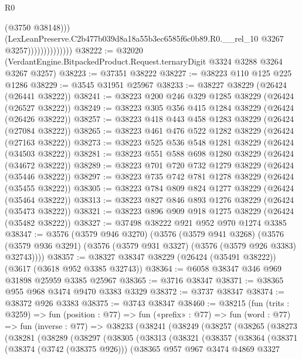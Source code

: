 \begin{lexlean}{R0}
\begin{coremodule}
                                  (@3750 @38148)))
                              (LexLeanPreserve.C2b477b039d8a18a55b3ec6585f6c0b89.R0.__rel_10
                                @3267
                                @3257))))))))))))))
@38222 := @32020 (VerdantEngine.BitpackedProduct.Request.ternaryDigit @3324 @3288 @3264 @3267 @3257)
@38223 := @37351 @38222
@38227 := @38223 @110 @125 @225 @1286
@38229 := @3545 @31951 @25967
@38233 := @38227 @38229 (@26424 (@26441 @38222))
@38241 := @38223 @200 @246 @329 @1285 @38229 (@26424 (@26527 @38222))
@38249 := @38223 @305 @356 @415 @1284 @38229 (@26424 (@26426 @38222))
@38257 := @38223 @418 @443 @458 @1283 @38229 (@26424 (@27084 @38222))
@38265 := @38223 @461 @476 @522 @1282 @38229 (@26424 (@27163 @38222))
@38273 := @38223 @525 @536 @548 @1281 @38229 (@26424 (@34503 @38222))
@38281 := @38223 @551 @588 @698 @1280 @38229 (@26424 (@34672 @38222))
@38289 := @38223 @701 @720 @732 @1279 @38229 (@26424 (@35446 @38222))
@38297 := @38223 @735 @742 @781 @1278 @38229 (@26424 (@35455 @38222))
@38305 := @38223 @784 @809 @824 @1277 @38229 (@26424 (@35464 @38222))
@38313 := @38223 @827 @846 @893 @1276 @38229 (@26424 (@35473 @38222))
@38321 := @38223 @896 @909 @918 @1275 @38229 (@26424 (@35482 @38222))
@38327 := @37498 @38222 @921 @952 @970 @1274 @3385
@38347 := @3576
    (@3579 @946 @3270)
    (@3576
      (@3579 @941 @3268)
      (@3576 (@3579 @936 @3291) (@3576 (@3579 @931 @3327) (@3576 (@3579 @926 @3383) @32743))))
@38357 := @38327 @38347 @38229 (@26424 (@35491 @38222)) (@3617 (@3618 @952 @3385 @32743))
@38364 := @6058 @38347 @346 @969 @31898 @25959 @3385 @25967
@38365 := @3716 @38347
@38371 := @38365 @955 @968 @3474 @9470 @3383 @3329
@38372 := @3737 @38347
@38374 := @38372 @926 @3383
@38375 := @3743 @38347
@38460 := @38215
    (fun (trits : @3259) =>
    fun (position : @77) =>
    fun («prefix» : @77) =>
    fun (word : @77) =>
    fun (inverse : @77) =>
    @38233
      (@38241
        (@38249
          (@38257
            (@38265
              (@38273
                (@38281
                  (@38289
                    (@38297
                      (@38305
                        (@38313
                          (@38321
                            (@38357
                              (@38364
                                (@38371
                                  (@38374 (@3742 (@38375 @926)))
                                  (@38365
                                    @957
                                    @967
                                    @3474
                                    @4869
                                    @3327

\end{coremodule}
\end{lexlean}
